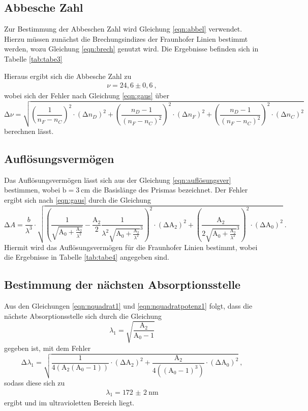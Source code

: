 \subsection{Abbesche Zahl}
Zur Bestimmung der Abbeschen Zahl wird Gleichung \ref{eqn:abbel} verwendet.
Hierzu müssen zunächst die Brechungsindizes der Fraunhofer Linien bestimmt werden,
wozu Gleichung \ref{eqn:brech} genutzt wird. Die Ergebnisse befinden sich in Tabelle
\ref{tab:tabe3}

Hieraus ergibt sich die Abbesche Zahl zu
\begin{align}
  \nu = 24,6 \pm 0,6 \: ,
\end{align}
wobei sich der Fehler nach Gleichung \ref{eqn:gaus} über
\begin{equation}
  \increment \nu = \sqrt{\left(\frac{1}{n_F-n_C} \right)^2 \cdot (\increment n_D)^2
  + \left(\frac{n_D-1}{(n_F-n_C)^2} \right)^2 \cdot (\increment n_F)^2
  + \left(\frac{n_D-1}{(n_F-n_C)^2} \right)^2 \cdot (\increment n_C)^2}
\end{equation}
berechnen lässt.

\subsection{Auflösungsvermögen}
Das Auflösungsvermögen lässt sich aus der Gleichung \ref{eqn:auflösungsver}
bestimmen, wobei $\text{b}=\SI{3}{\centi\meter}$ die Basislänge des Prismas
bezeichnet.
Der Fehler ergibt sich nach \ref{eqn:gaus} durch die Gleichung
\begin{equation}
  \increment A = \frac{b}{\lambda^3}\cdot \sqrt{\left( \frac{1}{\sqrt{\text{A}_0
  +\frac{\text{A}_2}{\lambda^2}}}-\frac{\text{A}_2}{2}\frac{1}{\lambda^2
  \sqrt{\text{A}_0 + \frac{\text{A}_2}{\lambda^2}}^3}\right)^2 \cdot (\increment \text{A}_2)^2
  + \left(\frac{\text{A}_2}{2
  \sqrt{\text{A}_0 + \frac{\text{A}_2}{\lambda^2}}^3}\right)^2 \cdot (\increment \text{A}_0)^2} \: .
\end{equation}
Hiermit wird das Auflösungsvermögen für die Fraunhofer Linien bestimmt, wobei die
Ergebnisse in Tabelle \ref{tab:tabe4} angegeben sind.


\subsection{Bestimmung der nächsten Absorptionsstelle}
Aus den Gleichungen \ref{eqn:nquadrat1} und \ref{eqn:nquadratpotenz1} folgt, dass die nächste Absorptionsstelle sich durch die
Gleichung
\begin{equation}
  \lambda_1 = \sqrt{\frac{\text{A}_2}{\text{A}_0-1}}
\end{equation}
gegeben ist, mit dem Fehler
\begin{equation}
  \increment \lambda_1 =\sqrt{\frac{1}{4(\text{A}_2(\text{A}_0-1))} \cdot (\increment
  \text{A}_2)^2 + \frac{\text{A}_2}{4((\text{A}_0-1)^3)} \cdot (\increment
  \text{A}_0)^2  } \: ,
\end{equation}
sodass diese sich zu
\begin{align*}
    \lambda_1 = \SI{172(2)}{\nano\meter}
\end{align*}
ergibt und im ultravioletten Bereich liegt.
